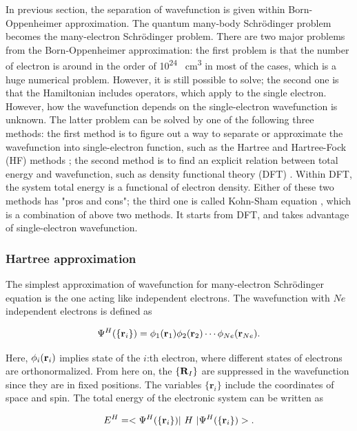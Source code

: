 \documentclass[a4paper, 12pt, titlepage,oneside,drop]{kthesis}
\begin{document}
In previous section, the separation of wavefunction is given within Born-Oppenheimer approximation. The quantum many-body Schrödinger problem becomes the many-electron 
Schrödinger problem. There are two major problems from the Born-Oppenheimer approximation: the first problem is that the number of electron is around in the order of 10\textsuperscript{24} \si{\per\cubic\centi\metre} in most
of the cases, which is a huge numerical problem. However, it is still possible to solve; the second one is that the Hamiltonian includes operators, which apply to the single electron. However, how the wavefunction depends on
the single-electron wavefunction is unknown. The latter problem can be solved by one of the following three methods: the first method is to figure out a way to separate or approximate the wavefunction into single-electron function,
such as the Hartree and Hartree-Fock (HF) methods \cite{hartreeapproximation,hartreefockapproximation}; the second method is to find an explicit relation between total energy and wavefunction, such as density functional theory (DFT)
\cite{hohenberg1964inhomogeneous}. Within DFT, the system total energy is a functional of electron density. Either of these two methods has "pros and cons"; the third one is called Kohn-Sham
equation \cite{kohn1965self}, which is a combination of above two methods. It starts from DFT, and takes advantage of single-electron wavefunction.

\subsubsection{Hartree approximation}
\label{ha}
The simplest approximation of wavefunction for many-electron Schrödinger equation is the one acting like independent
electrons. The wavefunction with $Ne$ independent electrons is defined as

\begin{equation}\label{wfh}
\wfh = \bwff<1><1> \bwff<2><2> \cdots \bwff<Ne><Ne>. 
\end{equation}

Here, $\bwff<i><i>$ implies state of the $i$:th electron, where different states of electrons are orthonormalized. From here on, the $\{{\textbf R}_I\}$ are suppressed in the
wavefunction since they are in fixed positions. The variables ${\{\textbf{r}_{{i}}}\}$ include the coordinates of space and spin. The total energy of the electronic system can be written as

\begin{equation}\label{teh}
E^{{H}} = <\Psi^{{H}}(\{ {\textbf r}_{{i}}\}) |\ {{H}} \ | \Psi^{{H}}(\{ {\textbf r}_{{i}}\})  >.
\end{equation}
\end{document}
